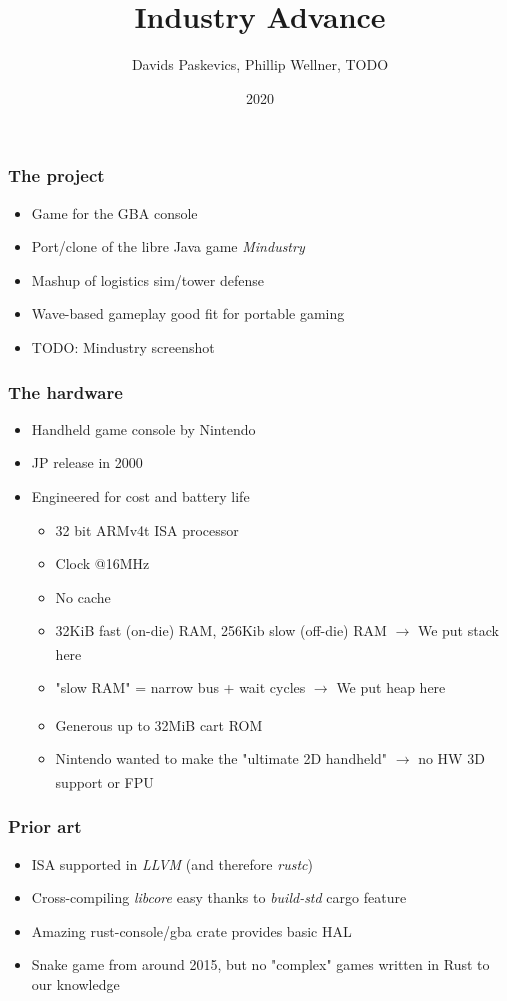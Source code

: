 \documentclass{beamer}
\title{Industry Advance}
\author{Davids Paskevics, Phillip Wellner, TODO}
\institute{FU Berlin}
\date{2020}
\begin{document}
\frame{\titlepage}

\begin{frame}
\frametitle{The project}
\begin{itemize}
	\item Game for the GBA console
    \item Port/clone of the libre Java game \emph{Mindustry}
    \item Mashup of logistics sim/tower defense
    \item Wave-based gameplay good fit for portable gaming
    \item TODO: Mindustry screenshot
\end{itemize}
\end{frame}

\begin{frame}
\frametitle{The hardware}
\begin{itemize}
    \item Handheld game console by Nintendo
	\item JP release in 2000
	\item Engineered for cost and battery life \begin{itemize}
		\item 32 bit ARMv4t ISA processor
		\item Clock @16MHz
		\item No cache
		\item 32KiB fast (on-die) RAM, 256Kib slow (off-die) RAM $\xrightarrow[]{}$ We put stack here
		\item "slow RAM" = narrow bus + wait cycles $\xrightarrow[]{}$ We put heap here
		\item Generous up to 32MiB cart ROM
		\item Nintendo wanted to make the "ultimate 2D handheld" $\xrightarrow[]{}$ no HW 3D support or FPU
	\end{itemize}
\end{itemize}
\end{frame}

\begin{frame}
\frametitle{Prior art}
\begin{itemize}
	\item ISA supported in \emph{LLVM} (and therefore \emph{rustc})
	\item Cross-compiling \emph{libcore} easy thanks to \emph{build-std} cargo feature
	\item Amazing rust-console/gba crate provides basic HAL
	\item Snake game from around 2015, but no "complex" games written in Rust to our knowledge
\end{itemize}
\end{frame}
\end{document}
